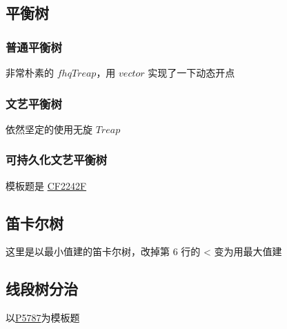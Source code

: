 \documentclass[12pt]{article}
\theoremstyle{definition}
\theoremstyle{remark}
\begin{document}


\newpage

\subsection{平衡树}

\subsubsection{普通平衡树}

非常朴素的 $fhqTreap$，用 $vector$ 实现了一下动态开点



\newpage

\subsubsection{文艺平衡树}

依然坚定的使用无旋 $Treap$



\newpage

\subsubsection{可持久化文艺平衡树}

模板题是 \href{https://codeforces.com/contest/2242/problem/F}{CF2242F}



\newpage

\subsection{笛卡尔树}

这里是以最小值建的笛卡尔树，改掉第 6 行的 < 变为用最大值建



\newpage

\subsection{线段树分治}

以\href{https://www.luogu.com.cn/problem/P5787}{P5787}为模板题
\end{document}
